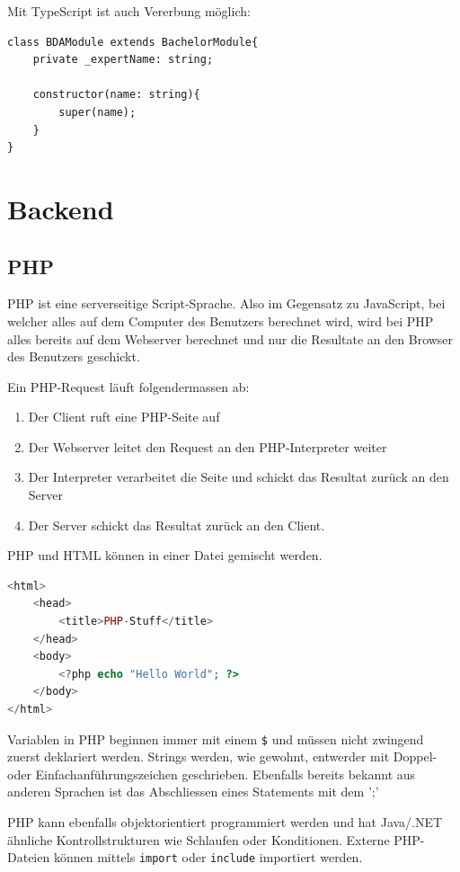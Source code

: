 \documentclass[a4paper, 11pt]{article}
\newcommand{\code}[1]{\texttt{#1}}
\begin{document}
Mit TypeScript ist auch Vererbung möglich:
\begin{lstlisting}
class BDAModule extends BachelorModule{
	private _expertName: string;
	
	constructor(name: string){
		super(name);
	}
}
\end{lstlisting}

\section{Backend}
\subsection{PHP}
PHP ist eine serverseitige Script-Sprache. Also im Gegensatz zu JavaScript, bei welcher alles auf dem Computer des Benutzers berechnet wird, wird bei PHP alles bereits auf dem Webserver berechnet und nur die Resultate an den Browser des Benutzers geschickt. 

Ein PHP-Request läuft folgendermassen ab:

\begin{enumerate}
	\item Der Client ruft eine PHP-Seite auf
	\item Der Webserver leitet den Request an den PHP-Interpreter weiter
	\item Der Interpreter verarbeitet die Seite und  schickt das Resultat zurück an den Server
	\item Der Server schickt das Resultat zurück an den Client.
\end{enumerate}

PHP und HTML können in einer Datei gemischt werden.

\begin{lstlisting}[language=php]
<html>
	<head>
		<title>PHP-Stuff</title>
	</head>
	<body>
		<?php echo "Hello World"; ?>
	</body>
</html>
\end{lstlisting}

Variablen in PHP beginnen immer mit einem \code{\$} und müssen nicht zwingend zuerst deklariert werden. Strings werden, wie gewohnt, entwerder mit Doppel- oder Einfachanführungszeichen geschrieben. Ebenfalls bereits bekannt aus anderen Sprachen ist das Abschliessen eines Statements mit dem ';'

\vspace{10px}

\noindent PHP kann ebenfalls objektorientiert programmiert werden und hat Java/.NET ähnliche Kontrollstrukturen wie Schlaufen oder Konditionen. Externe PHP-Dateien können mittels \code{import} oder \code{include} importiert werden.
\end{document}
